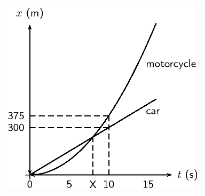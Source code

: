 \begin{enumerate}[noitemsep, label=\textbf{\arabic*}. ]
	\begin{figure}[H] %
    \begin{center}
    \label{m38796*id82149!!!underscore!!!media}\label{m38796*id82149!!!underscore!!!printimage}\includegraphics[width=5cm]{col11305.imgs/m38796_PG10C2_053.png} %
        
      \vspace{2pt}
    \vspace{.1in}
    
    \end{center}

 \end{figure}   


\end{enumerate}
